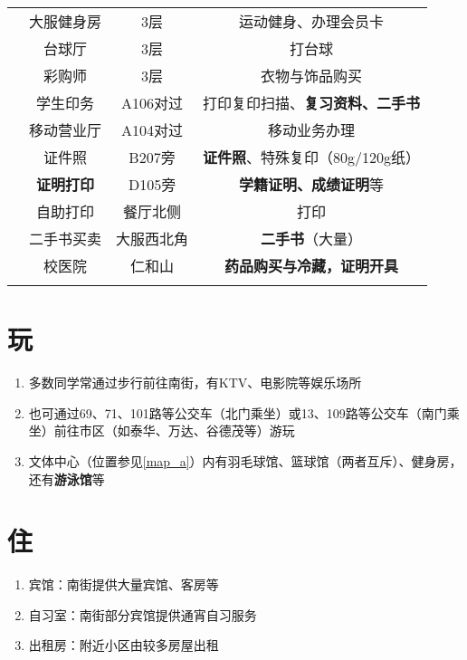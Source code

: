 \begin{table}[H]
\begin{tabular}{|c|c|c|c|}
        \cline{2-4}
                              & 大服健身房                                                     %
        \footnotemark %
                              & 3层            & 运动健身、办理会员卡                                \\
        \cline{2-4}
                              & 台球厅           & 3层         & 打台球                          \\
        \cline{2-4}
                              & 彩购师           & 3层         & 衣物与饰品购买                      \\
        \Xhline{1.2pt}
        \multirow{2}{*}{中和广场} & 学生印务          & A106对过     & 打印复印扫描、\textbf{复习资料、二手书}     \\
        \cline{2-4}
                              & 移动营业厅         & A104对过     & 移动业务办理                       \\
        \Xhline{1.2pt}
        \multirow{5}{*}{其他}   & 证件照           & B207旁      & \textbf{证件照}、特殊复印（80g/120g纸） \\
        \cline{2-4}
                              & \textbf{证明打印} & D105旁      & \textbf{学籍证明、成绩证明}等          \\
        \cline{2-4}
                              & 自助打印          & 餐厅北侧       & 打印                           \\
        \cline{2-4}
                              & 二手书买卖         & 大服西北角      & \textbf{二手书}（大量）             \\
        \cline{2-4}
                              & 校医院           & 仁和山        & \textbf{药品购买与冷藏，证明开具}        \\
        \Xhline{1.2pt}
    \end{tabular}
\end{table}

\section[玩]{玩}
\begin{enumerate}
    \item 多数同学常通过步行前往南街，有KTV、电影院等娱乐场所
    \item 也可通过69、71、101路等公交车（北门乘坐）或13、109路等公交车（南门乘坐）前往市区（如泰华、万达、谷德茂等）游玩
    \item 文体中心（位置参见\uline{\ref{map_a}}）内有羽毛球馆、篮球馆（两者互斥）、健身房，还有\textbf{游泳馆}等\footnotemark
\end{enumerate}

\section[住]{住}
\begin{enumerate}
    \item 宾馆：南街提供大量宾馆、客房等
    \item 自习室：南街部分宾馆提供通宵自习服务
    \item 出租房：附近小区由较多房屋出租\footnotemark
\end{enumerate}
